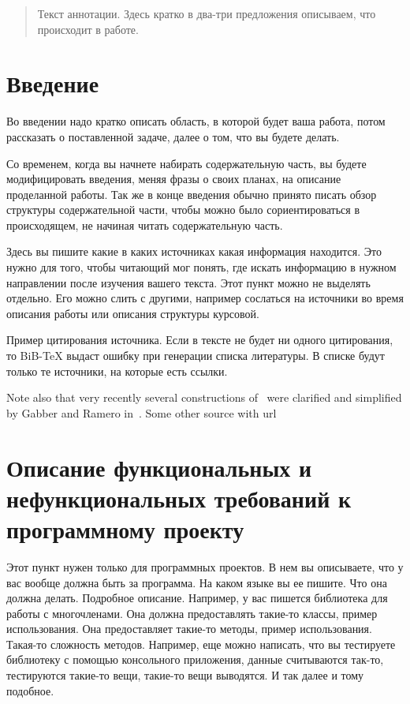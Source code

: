 \documentclass{article}
\begin{document}
\makeTitlePage

\tableofcontents

\begin{abstract}
Текст аннотации. Здесь кратко в два-три предложения описываем, что происходит в работе.
\end{abstract}


\section{Введение}

Во введении надо кратко описать область, в которой будет ваша работа, потом рассказать о поставленной задаче, далее о том, что вы будете делать.


Со временем, когда вы начнете набирать содержательную часть, вы будете модифицировать введения, меняя фразы о своих планах, на описание проделанной работы. Так же в конце введения обычно принято писать обзор структуры содержательной части, чтобы можно было сориентироваться в происходящем, не начиная читать содержательную часть.

Здесь вы пишите какие в каких источниках какая информация находится. Это нужно для того, чтобы читающий мог понять, где искать информацию в нужном направлении после изучения вашего текста. Этот пункт можно не выделять отдельно. Его можно слить с другими, например сослаться на источники во время описания работы или описания структуры курсовой.

Пример цитирования источника. Если в тексте не будет ни одного цитирования, то BiB-TeX выдаст ошибку при генерации списка литературы. В списке будут только те источники, на которые есть ссылки.

Note also that very recently several constructions of~\cite{Elkik73} were clarified and simplified by Gabber and Ramero in~\cite[Chapter~5]{GabRam}. Some other source with url~\cite{GGO}

\section{Описание функциональных и нефункциональных требований к программному проекту}

Этот пункт нужен только для программных проектов. В нем вы описываете, что у вас вообще должна быть за программа. На каком языке вы ее пишите. Что она должна делать. Подробное описание. Например, у вас пишется библиотека для работы с многочленами. Она должна предоставлять такие-то классы, пример использования. Она предоставляет такие-то методы, пример использования. Такая-то сложность методов. Например, еще можно написать, что вы тестируете библиотеку с помощью консольного приложения, данные считываются так-то, тестируются такие-то вещи, такие-то вещи выводятся. И так далее и тому подобное.
\end{document}
